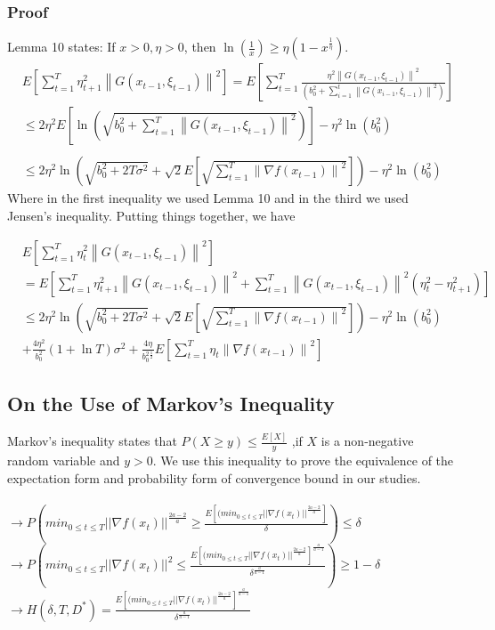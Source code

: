 \documentclass[14pt,onecolumn,letterpaper]{extarticle}
\begin{document}
\subsubsection{Proof}
Lemma 10 states: If $x>0, \eta>0$, then $\ln (\frac{1}{x}) \geq \eta\left(1-x^{\frac{1}{\eta}}\right)$.
$$
\begin{aligned}
& {E}\left[\sum_{t=1}^T \eta_{t+1}^2\left\|{G}\left({x}_{t-1}, \xi_{t-1}\right)\right\|^2\right]={E}\left[\sum_{t=1}^T \frac{\eta^2\left\|{G}\left({x}_{t-1}, \xi_{t-1}\right)\right\|^2}{\left(b_0^2 +\sum_{i=1}^t\left\|{G}\left({x}_{i-1}, \xi_{i-1}\right)\right\|^2\right)}\right] \\
& \leq 2 \eta^2 {E}\left[\ln \left(\sqrt{b_0^2 +\sum_{t=1}^T\left\|{G}\left({x}_{t-1}, \xi_{t-1}\right)\right\|^2}\right)\right]-\eta^2 \ln \left(b_0^2\right)\\
& \\
& \leq 2 \eta^2 \ln \left(\sqrt{b_0^2 +2 T \sigma^2}+\sqrt{2} {E}\left[\sqrt{\sum_{t=1}^T\left\|\nabla f\left({x}_{t-1}\right)\right\|^2}\right]\right)-\eta^2 \ln \left(b_0^2\right)
\end{aligned}
$$
Where in the first inequality we used Lemma 10 and in the third we used Jensen's inequality.
Putting things together, we have\par
\begin{align*}
& {E}\left[\sum_{t=1}^T \eta_t^2\left\|{G}\left({x}_{t-1}, \xi_{t-1}\right)\right\|^2\right]\\&={E}\left[\sum_{t=1}^T \eta_{t+1}^2\left\|{G}\left({x}_{t-1}, \xi_{t-1}\right)\right\|^2+\sum_{t=1}^T\left\|{G}\left({x}_{t-1}, \xi_{t-1}\right)\right\|^2\left(\eta_t^2-\eta_{t+1}^2\right)\right] \\
& \leq 2 \eta^2 \ln \left(\sqrt{b_0^2 +2 T \sigma^2}+\sqrt{2} {E}\left[\sqrt{\sum_{t=1}^T\left\|\nabla f\left({x}_{t-1}\right)\right\|^2}\right]\right)-\eta^2 \ln \left(b_0^2\right)
\\&+\frac{4 \eta^2}{b_0^2 }(1+\ln T) \sigma^2+\frac{4 \eta}{b_0^2 ^{\frac{1}{2}}} {E}\left[\sum_{t=1}^T \eta_t\left\|\nabla f\left({x}_{t-1}\right)\right\|^2\right]
\end{align*}

\subsection{On the Use of Markov's Inequality}
Markov's inequality states that $P(X\geq y)\leq \frac{E[X]}{y}$ ,if $X$ is a non-negative random variable and $y > 0$. We use this inequality to prove the equivalence of the expectation form and probability form of convergence bound in our studies.\\\\
    $\rightarrow P(min_{0\leq t \leq T} ||\nabla f(x_t)||^{\frac{2a-2}{a}} \geq \frac{E[(min_{0\leq t \leq T} ||\nabla f(x_t)||^{\frac{2a-2}{a}}]}{\delta}) \leq \delta$\\
    $\rightarrow P(min_{0\leq t \leq T} ||\nabla f(x_t)||^2 \leq \frac{E\left[(min_{0\leq t \leq T} ||\nabla f(x_t)||^{\frac{2a-2}{a}}\right]^{\frac{a}{a-1}}}{\delta^{\frac{a}{a-1}}}) \geq 1-\delta$\\
    $\rightarrow H(\delta, T, D^*)=\frac{E\left[(min_{0\leq t \leq T} ||\nabla f(x_t)||^{\frac{2a-2}{a}}\right]^{\frac{a}{a-1}}}{\delta^{\frac{a}{a-1}}}$
\end{document}
